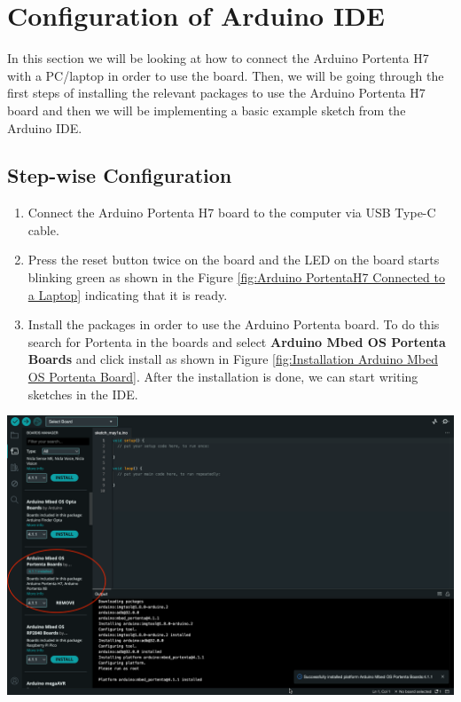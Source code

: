 	\section{Configuration of Arduino IDE}
	
	In this section we will be looking at how to connect the Arduino Portenta H7 with a PC/laptop in order to use the board. Then, we will be going through the first steps of installing the relevant packages to use the Arduino Portenta H7 board and then we will be implementing a basic example sketch from the Arduino IDE.
	
	\subsection{Step-wise Configuration}
	
	\begin{enumerate}
		
		\item Connect the Arduino Portenta H7 board to the computer via USB Type-C cable.
		\item Press the reset button twice on the board and the LED on the board starts blinking green as shown in the Figure \ref{fig:Arduino PortentaH7 Connected to a Laptop} indicating that it is ready.
		
		
		
		\item Install the packages in order to use the Arduino Portenta board. To do this search for Portenta in the boards and select \textbf{Arduino Mbed OS Portenta Boards} and click install as shown in Figure \ref{fig:Installation Arduino Mbed OS Portenta Board}. After the installation is done, we can start writing sketches in the IDE.
	\end{enumerate}	
			
	\begin{center}
		\label{fig:Installation Arduino Mbed OS Portenta Board}
		\includegraphics[width=0.7\linewidth]{images/ArduinoIDE/ArduinoMbedOSPortentaBoardsInstallation.png}
	\end{center}
	

